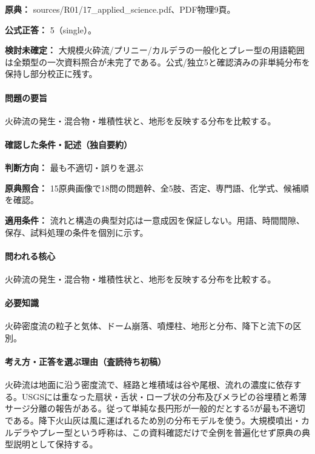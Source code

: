 \noindent\textbf{原典：} sources/R01/17\_applied\_science.pdf、PDF物理9頁。

\textbf{公式正答：} 5（single）。

\par\textbf{検討未確定：} 大規模火砕流/プリニー/カルデラの一般化とプレー型の用語範囲は全類型の一次資料照合が未完了である。公式/独立5と確認済みの非単純分布を保持し部分校正に残す。

\paragraph{問題の要旨} 火砕流の発生・混合物・堆積性状と、地形を反映する分布を比較する。

\paragraph{確認した条件・記述（独自要約）}\mbox{}\par

\noindent\textbf{判断方向：} 最も不適切・誤りを選ぶ\par

\noindent\textbf{原典照合：} 15原典画像で18問の問題幹、全5肢、否定、専門語、化学式、候補順を確認。\par

\noindent\textbf{適用条件：} 流れと構造の典型対応は一意成因を保証しない。用語、時間間隙、保存、試料処理の条件を個別に示す。\par

\paragraph{問われる核心} 火砕流の発生・混合物・堆積性状と、地形を反映する分布を比較する。

\paragraph{必要知識} 火砕密度流の粒子と気体、ドーム崩落、噴煙柱、地形と分布、降下と流下の区別。

\paragraph{考え方・正答を選ぶ理由（査読待ち初稿）} 火砕流は地面に沿う密度流で、経路と堆積域は谷や尾根、流れの濃度に依存する。USGSには重なった扇状・舌状・ローブ状の分布及びメラピの谷埋積と希薄サージ分離の報告がある。従って単純な長円形が一般的だとする5が最も不適切である。降下火山灰は風に運ばれるため別の分布モデルを使う。大規模噴出・カルデラやプレー型という呼称は、この資料確認だけで全例を普遍化せず原典の典型説明として保持する。


